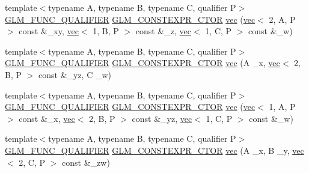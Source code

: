 \begin{DoxyCompactItemize}
\item 
{\footnotesize template$<$typename A, typename B, typename C, qualifier P$>$ }\\\mbox{\hyperlink{setup_8hpp_a33fdea6f91c5f834105f7415e2a64407}{G\+L\+M\+\_\+\+F\+U\+N\+C\+\_\+\+Q\+U\+A\+L\+I\+F\+I\+ER}} \mbox{\hyperlink{setup_8hpp_ad34178a09666081abdb573c14d1f4a5a}{G\+L\+M\+\_\+\+C\+O\+N\+S\+T\+E\+X\+P\+R\+\_\+\+C\+T\+OR}} \mbox{\hyperlink{structglm_1_1vec_3_014_00_01_t_00_01_q_01_4_af06a1fc4d33ca1bc9b1bf7c54d1b7271}{vec}} (\mbox{\hyperlink{structglm_1_1vec}{vec}}$<$ 2, A, P $>$ const \&\+\_\+xy, \mbox{\hyperlink{structglm_1_1vec}{vec}}$<$ 1, B, P $>$ const \&\+\_\+z, \mbox{\hyperlink{structglm_1_1vec}{vec}}$<$ 1, C, P $>$ const \&\+\_\+w)
\item 
{\footnotesize template$<$typename A, typename B, typename C, qualifier P$>$ }\\\mbox{\hyperlink{setup_8hpp_a33fdea6f91c5f834105f7415e2a64407}{G\+L\+M\+\_\+\+F\+U\+N\+C\+\_\+\+Q\+U\+A\+L\+I\+F\+I\+ER}} \mbox{\hyperlink{setup_8hpp_ad34178a09666081abdb573c14d1f4a5a}{G\+L\+M\+\_\+\+C\+O\+N\+S\+T\+E\+X\+P\+R\+\_\+\+C\+T\+OR}} \mbox{\hyperlink{structglm_1_1vec_3_014_00_01_t_00_01_q_01_4_a4e0096b6a4a96926e0ab495f3cb52403}{vec}} (A \+\_\+x, \mbox{\hyperlink{structglm_1_1vec}{vec}}$<$ 2, B, P $>$ const \&\+\_\+yz, C \+\_\+w)
\item 
{\footnotesize template$<$typename A, typename B, typename C, qualifier P$>$ }\\\mbox{\hyperlink{setup_8hpp_a33fdea6f91c5f834105f7415e2a64407}{G\+L\+M\+\_\+\+F\+U\+N\+C\+\_\+\+Q\+U\+A\+L\+I\+F\+I\+ER}} \mbox{\hyperlink{setup_8hpp_ad34178a09666081abdb573c14d1f4a5a}{G\+L\+M\+\_\+\+C\+O\+N\+S\+T\+E\+X\+P\+R\+\_\+\+C\+T\+OR}} \mbox{\hyperlink{structglm_1_1vec_3_014_00_01_t_00_01_q_01_4_ad25742ead79d7c154707dcb1d6c9488d}{vec}} (\mbox{\hyperlink{structglm_1_1vec}{vec}}$<$ 1, A, P $>$ const \&\+\_\+x, \mbox{\hyperlink{structglm_1_1vec}{vec}}$<$ 2, B, P $>$ const \&\+\_\+yz, \mbox{\hyperlink{structglm_1_1vec}{vec}}$<$ 1, C, P $>$ const \&\+\_\+w)
\item 
{\footnotesize template$<$typename A, typename B, typename C, qualifier P$>$ }\\\mbox{\hyperlink{setup_8hpp_a33fdea6f91c5f834105f7415e2a64407}{G\+L\+M\+\_\+\+F\+U\+N\+C\+\_\+\+Q\+U\+A\+L\+I\+F\+I\+ER}} \mbox{\hyperlink{setup_8hpp_ad34178a09666081abdb573c14d1f4a5a}{G\+L\+M\+\_\+\+C\+O\+N\+S\+T\+E\+X\+P\+R\+\_\+\+C\+T\+OR}} \mbox{\hyperlink{structglm_1_1vec_3_014_00_01_t_00_01_q_01_4_ad157b736479c1663d886b63c5992c10e}{vec}} (A \+\_\+x, B \+\_\+y, \mbox{\hyperlink{structglm_1_1vec}{vec}}$<$ 2, C, P $>$ const \&\+\_\+zw)

\end{DoxyCompactItemize}
